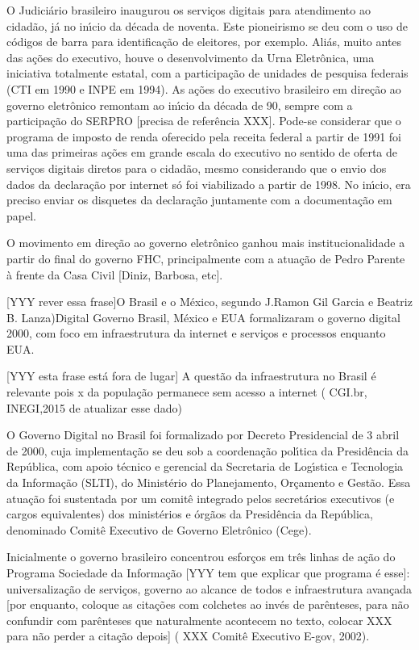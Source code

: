 \documentclass[
12pt,		%
openright,	%
twoside,  %
a4paper,			%
chapter=TITLE,		%
english,			%
french,				%
spanish,			%
brazil				%
]{USPSC-classe/USPSC}
\begin{document}
O Judici\'ario brasileiro inaugurou os servi\c{c}os digitais para atendimento ao cidad\~ao, j\'a no in\'{\i}cio da d\'ecada de noventa. Este pioneirismo se deu com o uso de c\'odigos de barra para identifica\c{c}\~ao de eleitores, por exemplo. Ali\'as, muito antes das a\c{c}\~oes do executivo, houve o desenvolvimento da Urna Eletr\^onica, uma iniciativa totalmente estatal, com a participa\c{c}\~ao de unidades de pesquisa federais (CTI em 1990 e INPE em 1994). As a\c{c}\~oes do executivo brasileiro em dire\c{c}\~ao ao governo eletr\^onico remontam ao in\'{\i}cio da d\'ecada de 90, sempre com a participa\c{c}\~ao do SERPRO [precisa de refer\^encia XXX]. Pode-se considerar que o programa de imposto de renda oferecido pela receita federal a partir de 1991 foi uma das primeiras a\c{c}\~oes em grande escala do executivo no sentido de oferta de servi\c{c}os digitais diretos para o cidad\~ao, mesmo considerando que o envio dos dados da declara\c{c}\~ao por internet s\'o foi viabilizado a partir de 1998. No in\'{\i}cio, era preciso enviar os disquetes da declara\c{c}\~ao juntamente com a documenta\c{c}\~ao em papel.


O movimento em dire\c{c}\~ao ao governo eletr\^onico ganhou mais institucionalidade a partir do final do governo FHC, principalmente com a atua\c{c}\~ao de Pedro Parente \`a frente da Casa Civil [Diniz, Barbosa, etc].


[YYY rever essa frase]O Brasil e o M\'exico, segundo J.Ramon Gil Garcia e Beatriz B. Lanza)Digital Governo Brasil, M\'exico e EUA formalizaram o governo digital 2000, com foco em infraestrutura da internet e servi\c{c}os e processos enquanto EUA.


[YYY esta frase est\'a fora de lugar] A quest\~ao da infraestrutura no Brasil \'e relevante pois x da popula\c{c}\~ao permanece sem acesso a internet ( CGI.br, INEGI,2015 de atualizar esse dado)


O Governo Digital no Brasil foi formalizado por Decreto Presidencial de 3 abril de 2000, cuja implementa\c{c}\~ao se deu sob a coordena\c{c}\~ao pol\'{\i}tica da Presid\^encia da Rep\'ublica, com apoio t\'ecnico e gerencial da Secretaria de Log\'{\i}stica e Tecnologia da Informa\c{c}\~ao (SLTI), do Minist\'erio do Planejamento, Or\c{c}amento e Gest\~ao. Essa atua\c{c}\~ao foi sustentada por um comit\^e integrado pelos secret\'arios executivos (e cargos equivalentes) dos minist\'erios e \'org\~aos da Presid\^encia da Rep\'ublica, denominado Comit\^e Executivo de Governo Eletr\^onico (Cege).


Inicialmente o governo brasileiro concentrou esfor\c{c}os em tr\^es linhas de a\c{c}\~ao do Programa Sociedade da Informa\c{c}\~ao [YYY tem que explicar que programa \'e esse]: universaliza\c{c}\~ao de servi\c{c}os, governo ao alcance de todos e infraestrutura avan\c{c}ada [por enquanto, coloque as cita\c{c}\~oes com colchetes ao inv\'es de par\^enteses, para n\~ao confundir com par\^enteses que naturalmente acontecem no texto, colocar XXX para n\~ao perder a cita\c{c}\~ao depois] ( XXX Comit\^e Executivo E-gov, 2002).
\end{document}
